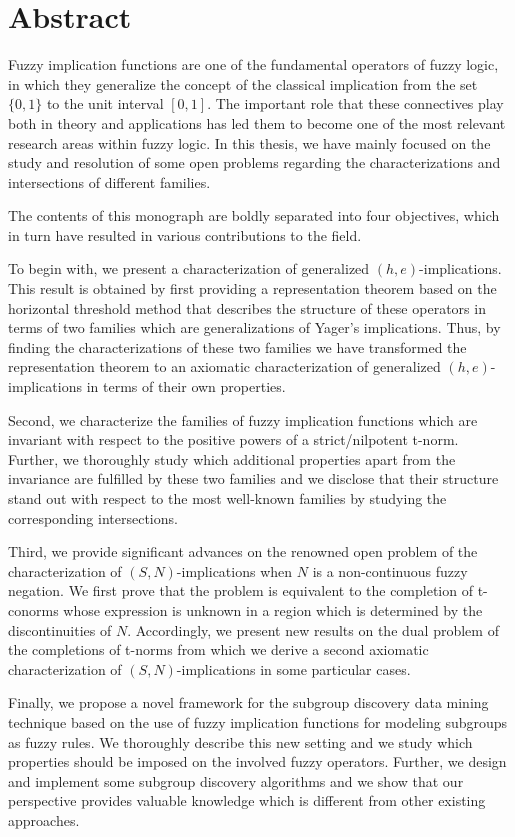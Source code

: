 \chapter*{Abstract}

Fuzzy implication functions are one of the fundamental operators of fuzzy logic, in which they generalize the concept of the classical implication from the set $\{0,1\}$ to the unit interval $[0,1]$. The important role that these connectives play both in theory and applications has led them to become one of the most relevant research areas within fuzzy logic. In this thesis, we have mainly focused on the study and resolution of some open problems regarding the characterizations and intersections of different families.

The contents of this monograph are boldly separated into four objectives, which in turn have resulted in various contributions to the field.

To begin with, we present a characterization of generalized $(h,e)$-im\-pli\-ca\-tions. This result is obtained by first providing a representation theorem based on the horizontal threshold method that describes the structure of these operators in terms of two families which are generalizations of Yager's implications. Thus, by finding the characterizations of these two families we have transformed the representation theorem to an axiomatic characterization of generalized $(h,e)$-implications in terms of their own properties.

Second, we characterize the families of fuzzy implication functions which are invariant with respect to the positive powers of a strict/nilpotent t-norm. Further, we thoroughly study which additional properties apart from the invariance are fulfilled by these two families and we disclose that their structure stand out with respect to the most well-known families by studying the corresponding intersections.

Third, we provide significant advances on the renowned open problem of the characterization of $(S,N)$-implications when $N$ is a non-continuous fuzzy negation. We first prove that the problem is equivalent to the completion of t-conorms whose expression is unknown in a region which is determined by the discontinuities of $N$. Accordingly, we present new results on the dual problem of the completions of t-norms from which we derive a second axiomatic characterization of $(S,N)$-implications in some particular cases.

Finally, we propose a novel framework for the subgroup discovery data mining technique based on the use of fuzzy implication functions for modeling subgroups as fuzzy rules. We thoroughly describe this new setting and we study which properties should be imposed on the involved fuzzy operators. Further, we design and implement some subgroup discovery algorithms and we show that our perspective provides valuable knowledge which is different from other existing approaches.

